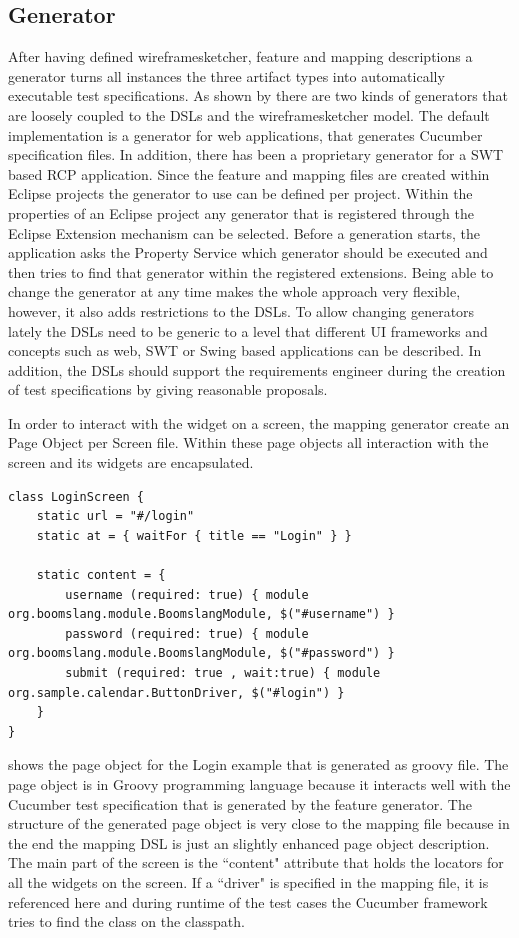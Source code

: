 \documentclass{sig-alternate-05-2015}
\begin{document}
\subsection{Generator}\label{sec:Generator} 
After having defined wireframesketcher, feature and mapping descriptions a generator turns all instances the three artifact types into automatically executable test specifications.
As shown by  there are two kinds of generators that are loosely coupled to the DSLs and the wireframesketcher model.
The default implementation is a generator for web applications, that generates Cucumber specification files.
In addition, there has been a proprietary generator for a SWT based RCP application.
Since the feature and mapping files are created within Eclipse projects the generator to use can be defined per project.
Within the properties of an Eclipse project any generator that is registered through the Eclipse Extension mechanism can be selected.
Before a generation starts, the application asks the Property Service which generator should be executed and then tries to find that generator within the registered extensions.
Being able to change the generator at any time makes the whole approach very flexible, however, it also adds restrictions to the DSLs.
To allow changing generators lately the DSLs need to be generic to a level that different UI frameworks and concepts such as web, SWT or Swing based applications can be described.
In addition, the DSLs should support the requirements engineer during the creation of test specifications by giving reasonable proposals.

In order to interact with the widget on a screen, the mapping generator create an Page Object \cite{fowler.2013} per Screen file.
Within these page objects all interaction with the screen and its widgets are encapsulated.

\begin{lstlisting}[captionpos=b, caption=Generated Page Object, label={lst:MappingGenerated}, language=dsl]
class LoginScreen {
	static url = "#/login"
	static at = { waitFor { title == "Login" } }
	
	static content = {
		username (required: true) { module org.boomslang.module.BoomslangModule, $("#username") }
		password (required: true) { module org.boomslang.module.BoomslangModule, $("#password") }
		submit (required: true , wait:true) { module org.sample.calendar.ButtonDriver, $("#login") }
	}
}
\end{lstlisting}

 shows the page object for the Login example that is generated as groovy file.
The page object is in Groovy programming language because it interacts well with the Cucumber test specification that is generated by the feature generator.
The structure of the generated page object is very close to the mapping file because in the end the mapping DSL is just an slightly enhanced page object description.
The main part of the screen is the ``content" attribute that holds the locators for all the widgets on the screen.
If a ``driver" is specified in the mapping file, it is referenced here and during runtime of the test cases the Cucumber framework tries to find the class on the classpath.
\end{document}

